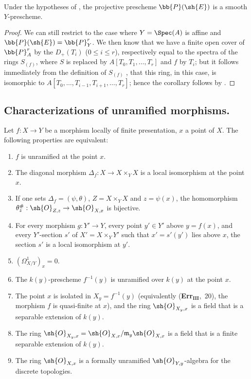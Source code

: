 \begin{corollary}[17.3.9]
\label{IV.17.3.9}
Under the hypotheses of , the projective prescheme $\bb{P}(\sh{E})$  is a smooth $Y$-prescheme.
\end{corollary}

\begin{proof}
We can still restrict to the case where $Y=\Spec(A)$ is affine and $\bb{P}(\sh{E})=\bb{P}_Y^r$.
We then know  that we have a finite open cover of $\bb{P}^r_{A}$ by the $D_+(T_i)$ ($0\leq i\leq r$), respectively equal to the spectra of the rings $S_{(f)}$, where $S$ is replaced by $A[T_0,T_1,\dots,T_r]$ and $f$ by $T_i$;
but it follows immediately from the definition of $S_{(f)}$ , that this ring, in this case, is isomorphic to $A[T_0,\dots,T_{i-1},T_{i+1},\dots,T_r]$;
hence the corollary follows by .
\end{proof}

\subsection{Characterizations of unramified morphisms.}
\label{subsection:IV.17.4}


\begin{theorem}[17.4.1]
\label{IV.17.4.1}
Let $f:X\to Y$ be a morphism locally of finite presentation, $x$ a point of $X$.
The following properties are equivalent:
\begin{enumerate}[label=(\alph*)]
  \item $f$ is unramified at the point $x$.
  \item The diagonal morphism $\Delta_f:X\to X\times_Y X$ is a local isomorphism at the point $x$.
  \item[b')] If one sets $\Delta_f=(\psi,\theta)$, $Z=X\times_Y X$ and $z=\psi(x)$, the homomorphism $\theta_z^\#:\sh{O}_{Z,z}\to\sh{O}_{X,x}$ is bijective.
  \item[b'')] For every morphism $g:Y'\to Y$, every point $y'\in Y'$ above $y=f(x)$, and every $Y'$-section $s'$ of $X'=X\times_Y Y'$ such that $x'=s'(y')$ lies above $x$, the section $s'$ is a local isomorphism at $y'$.
  \item $(\Omega^1_{X/Y})_x=0$.
  \item The $k(y)$-prescheme $f^{-1}(y)$ is unramified over $k(y)$ at the point $x$.
  \item[d')] The point $x$ is isolated in $X_y=f^{-1}(y)$ (equivalently (\textbf{Err}$_\textbf{III}$,~20), the morphism $f$ is quasi-finite at $x$), and the ring $\sh{O}_{X_y,x}$ is a field that is a separable extension of $k(y)$.
  \item[d'')] The ring $\sh{O}_{X_y,x}=\sh{O}_{X,x}/\mathfrak{m}_y\sh{O}_{X,x}$ is a field that is a finite separable extension of $k(y)$.
  \item The ring $\sh{O}_{X,x}$ is a formally unramified $\sh{O}_{Y,y}$-algebra for the discrete topologies.
\end{enumerate}
\end{theorem}


